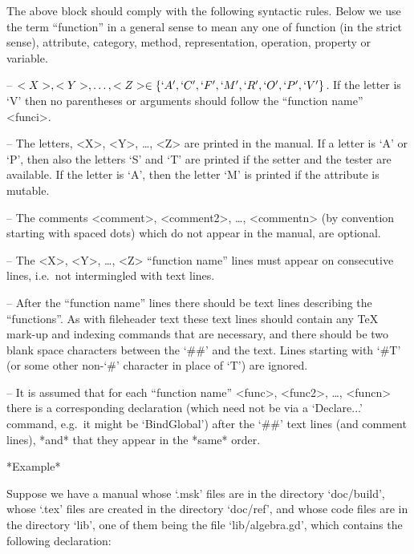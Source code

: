 The above block should comply with the following syntactic  rules.  Below
we use the term ``function'' in a  general  sense  to  mean  any  one  of
function  (in   the   strict   sense),   attribute,   category,   method,
representation, operation, property or variable.

\beginlist%

\item{--}
$<X>, <Y>, \dots, <Z> \in \{ `A', `C', `F', `M', `R', `O', `P', `V'  \}$.
If the letter is `V' then no parentheses or arguments should  follow  the
``function name'' <funci>.

\item{--} 
The letters, <X>, <Y>, \dots, <Z> are printed in the manual. If a  letter
is `A' or `P', then also the letters `S'  and  `T'  are  printed  if  the
setter and the tester are available. If  the  letter  is  `A',  then  the
letter `M' is printed if the attribute is mutable.

\item{--}
The comments <comment>,  <comment2>,  \dots,  <commentn>  (by  convention
starting with spaced dots)  which  do  not  appear  in  the  manual,  are
optional.

\item{--}
The  <X>,  <Y>,  \dots,  <Z>  ``function  name''  lines  must  appear  on
consecutive lines, i.e.~not intermingled with text lines.

\item{--}
After the ``function name'' lines there should be text  lines  describing
the ``functions''. As  with  fileheader  text  these  text  lines  should
contain any {\TeX} mark-up and indexing commands that are necessary,  and
there should be two blank space characters between  the  `\#\#'  and  the
text. Lines starting with `\#T' (or  some  other  non-`\#'  character  in
place of `T') are ignored.

\item{--} 
It is assumed that for each ``function  name''  <func>,  <func2>,  \dots,
<funcn> there is a corresponding {\GAP} declaration (which  need  not  be
via a `Declare...' command, e.g.~it  might  be  `BindGlobal')  after  the
`\#\#' text lines (and comment lines), *and*  that  they  appear  in  the
*same* order.

\endlist

\goodbreak%

*Example*

Suppose we have a manual whose `.msk' files are in the directory `doc/build',
whose `.tex' files are created in the directory `doc/ref',
and whose {\GAP} code files are in the directory `lib',
one of them being the file `lib/algebra.gd',
which contains the following declaration:

